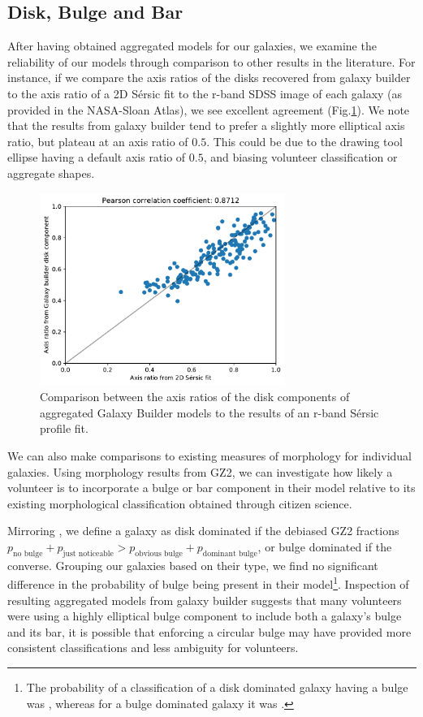 \documentclass[../main.tex]{subfiles}
\begin{document}
\subsection{Disk, Bulge and Bar}

After having obtained aggregated models for our galaxies, we examine the reliability of our models through comparison to other results in the literature. For instance, if we compare the axis ratios of the disks recovered from galaxy builder to the axis ratio of a 2D S\'ersic fit to the r-band SDSS image of each galaxy (as provided in the NASA-Sloan Atlas), we see excellent agreement (Fig.\ref{fig:ax_ratio_comparison}). We note that the results from galaxy builder tend to prefer a slightly more elliptical axis ratio, but plateau at an axis ratio of $0.5$. This could be due to the drawing tool ellipse having a default axis ratio of $0.5$, and biasing volunteer classification or aggregate shapes.

\begin{figure}
  \includegraphics[width=8cm]{images__results/GZBvsNSA_ax-ratio_SERSIC_BA.pdf}
  \caption{Comparison between the axis ratios of the disk components of aggregated Galaxy Builder models to the results of an r-band S\'ersic profile fit.}
  \label{fig:ax_ratio_comparison}
\end{figure}

We can also make comparisons to existing measures of morphology for individual galaxies. Using morphology results from GZ2, we can investigate how likely a volunteer is to incorporate a bulge or bar component in their model relative to its existing morphological classification obtained through citizen science.

Mirroring \citet{Kruk2017:1710.00093v2}, we define a galaxy as disk dominated if the debiased GZ2 fractions $p_\text{no bulge} + p_\text{just noticeable} > p_\text{obvious bulge} + p_\text{dominant bulge}$, or bulge dominated if the converse. Grouping our galaxies based on their type, we find no significant difference in the probability of bulge being present in their model\footnote{The probability of a classification of a disk dominated galaxy having a bulge was , whereas for a bulge dominated galaxy it was .}. Inspection of resulting aggregated models from galaxy builder suggests that many volunteers were using a highly elliptical bulge component to include both a galaxy's bulge and its bar, it is possible that enforcing a circular bulge may have provided more consistent classifications and less ambiguity for volunteers.
\end{document}
